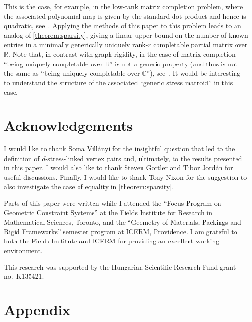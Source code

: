 \documentclass[11pt,a4paper,dvipsnames]{scrartcl}
\theoremstyle{definition}
\newcommand{\RR}{\mathbb{R}}
\newcommand{\CC}{\mathbb{C}}
\newcommand{\strongly}[1]{${#1}$-stress-linked}
\begin{document}
This is the case, for example, in the low-rank matrix completion problem, where the associated polynomial map is given by the standard dot product and hence is quadratic, see~\cite{kiraly.etal_2015,singer.cucuringu_2010}. Applying the methods of this paper to this problem leads to an analog of \cref{theorem:sparsity}, giving a linear upper bound on the number of known entries in a minimally generically uniquely rank-$r$ completable partial matrix over $\RR$. Note that, in contrast with graph rigidity, in the case of matrix completion ``being uniquely completable over $\RR$'' is not a generic property (and thus is not the same as ``being uniquely completable over $\CC$''), see~\cite{jackson.etal_2016}. It would be interesting to understand the structure of the associated ``generic stress matroid'' in this case.



\section*{Acknowledgements}

I would like to thank Soma Villányi for the insightful question that led to the definition of \strongly{d} vertex pairs and, ultimately, to the results presented in this paper. I would also like to thank Steven Gortler and Tibor Jordán for useful discussions. Finally, I would like to thank Tony Nixon for the suggestion to also investigate the case of equality in \cref{theorem:sparsity}.

Parts of this paper were written while I attended the ``Focus Program on Geometric Constraint Systems'' at the Fields Institute for
Research in Mathematical Sciences, Toronto, and the ``Geometry of Materials, Packings and Rigid Frameworks'' semester program at ICERM, Providence. I am grateful to both the Fields Institute and ICERM for providing an excellent working environment.

This research was supported by the Hungarian Scientific Research Fund
grant no.\ K135421.


\printbibliography

\appendix
{}
\section*{Appendix}
\renewcommand{\thesubsection}{\Alph{subsection}}

\renewcommand{\thetheorem}{\Alph{subsection}.\arabic{theorem}}
\renewcommand{\theproposition}{\Alph{subsection}.\arabic{proposition}}
\renewcommand{\thelemma}{\Alph{subsection}.\arabic{lemma}}
\end{document}
